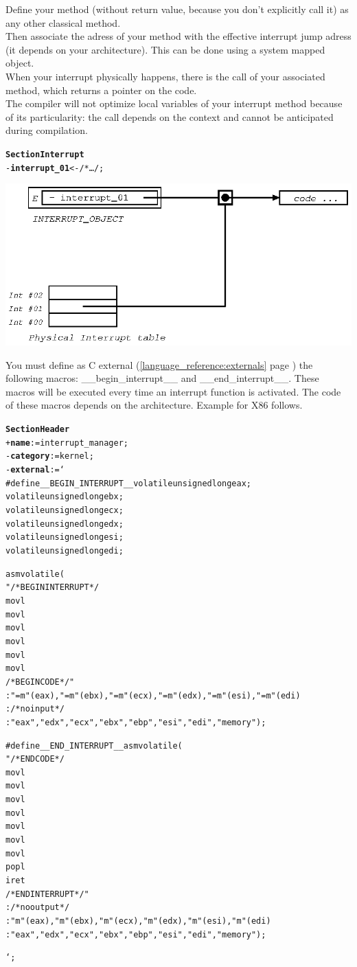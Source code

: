 \documentclass[11pt]{mybook}
\begin{document}
Define your method (without return value, because you don't explicitly call it) as any other classical method.\\
Then associate the adress of your method with the effective interrupt jump adress (it depends on your architecture). This can be done using a system mapped object.\\
When your interrupt physically happens, there is the call of your associated method, which returns a pointer on the code.\\
The compiler will not optimize local variables of your interrupt method because of its particularity: the call depends on the context and cannot be anticipated during compilation.
\begin{alltt}
{\bf{}Section Interrupt}
  - {\bf{}interrupt\_01} <- /* \ldots */;
\end{alltt} 
\begin{center}
\includegraphics[scale=1.0]{figures/interrupt}
\end{center}
You must define as C external (\ref{language_reference:externals} page \pageref{language_reference:externals}) the following macros: {\sc{}\_\_begin\_interrupt\_\_} and {\sc{}\_\_end\_interrupt\_\_}.
These macros will be executed every time an interrupt function is activated.
The code of these macros depends on the architecture.
Example for X86 follows.
\begin{alltt}
{\bf{}Section Header}
  + {\bf{}name} := {\sc{}interrupt\_manager};
  - {\bf{}category} := {\sc{}kernel};
  - {\bf{}external} := `  
#define __BEGIN_INTERRUPT__ volatile unsigned long eax;
  volatile unsigned long ebx;
  volatile unsigned long ecx;
  volatile unsigned long edx;
  volatile unsigned long esi;
  volatile unsigned long edi;
                             
  asm volatile (
  "/* BEGIN INTERRUPT */
  movl %
  movl %
  movl %
  movl %
  movl %
  movl %
  /* BEGIN CODE */"
  : "=m"(eax),"=m"(ebx),"=m"(ecx),"=m"(edx),"=m"(esi),"=m"(edi)
  : /* no input */
  : "eax","edx","ecx","ebx","ebp","esi","edi", "memory");

#define __END_INTERRUPT__ asm volatile (
 "/* END CODE */ 
  movl %
  movl %
  movl %
  movl %
  movl %
  movl %
  movl %
  popl %
  iret            
 /* END INTERRUPT */"
 : /* no output */ 
 : "m"(eax),"m"(ebx),"m"(ecx),"m"(edx),"m"(esi),"m"(edi)
 : "eax","edx","ecx","ebx","ebp","esi","edi", "memory");

`;
\end{alltt}
\end{document}
